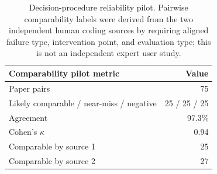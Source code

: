 \begin{table}[t]
\centering
\small
\begin{tabular}{lr}
\toprule
\textbf{Comparability pilot metric} & \textbf{Value} \\
\midrule
Paper pairs & 75 \\
Likely comparable / near-miss / negative & 25 / 25 / 25 \\
Agreement & 97.3\% \\
Cohen's $\kappa$ & 0.94 \\
Comparable by source 1 & 25 \\
Comparable by source 2 & 27 \\
\bottomrule
\end{tabular}
\caption{Decision-procedure reliability pilot. Pairwise comparability labels were derived from the two independent human coding sources by requiring aligned failure type, intervention point, and evaluation type; this is not an independent expert user study.}
\label{tab:comparability-pilot}
\end{table}
